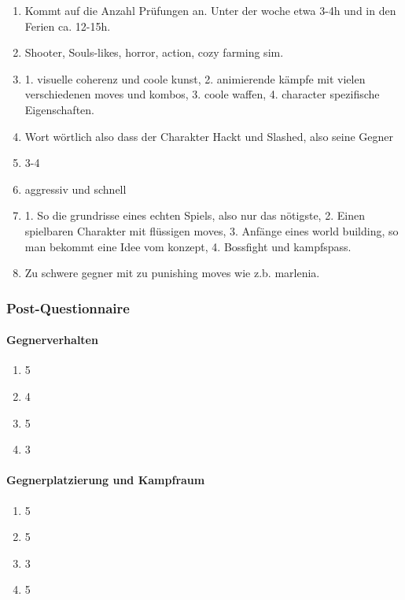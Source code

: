 \documentclass[../Main.tex]{subfiles}
\begin{document}
\begin{enumerate}[label=\textbf{P\arabic*}, leftmargin=1.5cm, itemsep=0.8em]
\item Kommt auf die Anzahl Prüfungen an. Unter der woche etwa 3-4h und in den Ferien ca. 12-15h.

\item Shooter, Souls-likes, horror, action, cozy farming sim.

\item 1. visuelle coherenz und coole kunst, 2. animierende kämpfe mit vielen verschiedenen moves und kombos, 3. coole waffen, 4. character spezifische Eigenschaften.

\item Wort wörtlich also dass der Charakter Hackt und Slashed, also seine Gegner

\item 3-4

\item aggressiv und schnell

\item 1. So die grundrisse eines echten Spiels, also nur das nötigste, 2. Einen spielbaren Charakter mit flüssigen moves, 3. Anfänge eines world building, so man bekommt eine Idee vom konzept, 4. Bossfight und kampfspass.

\item Zu schwere gegner mit zu punishing moves wie z.b. marlenia.
\end{enumerate}

\subsubsection{Post-Questionnaire}

\paragraph{Gegnerverhalten}
\begin{enumerate}[label=\textbf{Q\arabic*}, leftmargin=1.5cm, itemsep=0.8em]
\item 5
\item 4
\item 5
\item 3
\end{enumerate}

\paragraph{Gegnerplatzierung und Kampfraum}
\begin{enumerate}[label=\textbf{Q\arabic*}, leftmargin=1.5cm, itemsep=0.8em, resume]
\item 5
\item 5
\item 3
\item 5
\end{enumerate}
\end{document}
